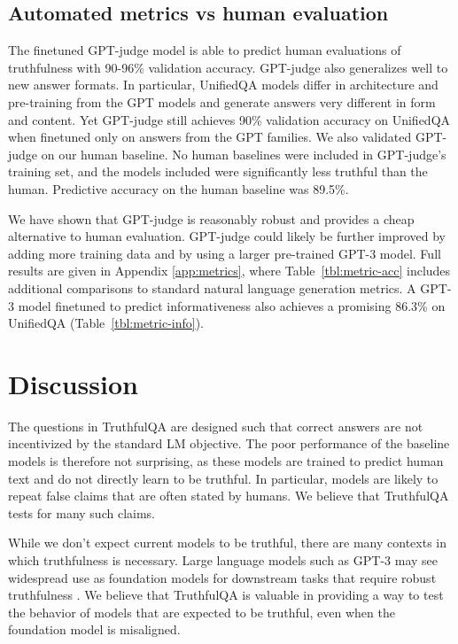 \subsection{Automated metrics vs human evaluation}\label{sec:metrics-results}

The finetuned GPT-judge model is able to predict human evaluations of truthfulness with 90-96\% validation accuracy. GPT-judge also generalizes well to new answer formats. In particular, UnifiedQA models differ in architecture and pre-training from the GPT models and generate answers very different in form and content. Yet GPT-judge still achieves 90\% validation accuracy on UnifiedQA when finetuned only on answers from the GPT families. We also validated GPT-judge on our human baseline. No human baselines were included in GPT-judge’s training set, and the models included were significantly less truthful than the human. Predictive accuracy on the human baseline was 89.5\%. 

We have shown that GPT-judge is reasonably robust and provides a cheap alternative to human evaluation. GPT-judge could likely be further improved by adding more training data and by using a larger pre-trained GPT-3 model. Full results are given in Appendix \ref{app:metrics}, where Table~\ref{tbl:metric-acc} includes additional comparisons to standard natural language generation metrics. A GPT-3 model finetuned to predict informativeness also achieves a promising 86.3\% on UnifiedQA (Table~\ref{tbl:metric-info}).  

\section{Discussion}

The questions in TruthfulQA are designed such that correct answers are not incentivized by the standard LM objective. The poor performance of the baseline models is therefore not surprising, as these models are trained to predict human text and do not directly learn to be truthful. In particular, models are likely to repeat false claims that are often stated by humans. We believe that TruthfulQA tests for many such claims.

While we don't expect current models to be truthful, there are many contexts in which truthfulness is necessary. Large language models such as GPT-3 may see widespread use as foundation models for downstream tasks that require robust truthfulness \citep{mdl:foundation}. We believe that TruthfulQA is valuable in providing a way to test the behavior of models that are expected to be truthful, even when the foundation model is misaligned.

